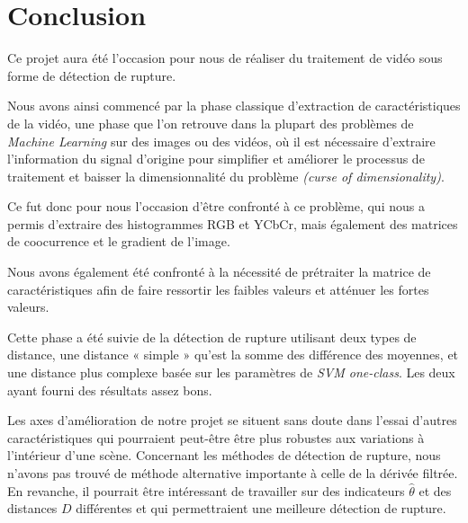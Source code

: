 \chapter{Conclusion}

Ce projet aura été l'occasion pour nous de réaliser du traitement de vidéo sous forme de détection de rupture.

Nous avons ainsi commencé par la phase classique d'extraction de caractéristiques de la vidéo, une phase que l'on retrouve dans la plupart des problèmes de \textit{Machine Learning} sur des images ou des vidéos, où il est nécessaire d'extraire l'information du signal d'origine pour simplifier et améliorer le processus de traitement et baisser la dimensionnalité du problème \textit{(curse of dimensionality)}.

Ce fut donc pour nous l'occasion d'être confronté à ce problème, qui nous a permis d'extraire des histogrammes RGB et YCbCr, mais également des matrices de coocurrence et le gradient de l'image.

Nous avons également été confronté à la nécessité de prétraiter la matrice de caractéristiques afin de faire ressortir les faibles valeurs et atténuer les fortes valeurs.

Cette phase a été suivie de la détection de rupture utilisant deux types de distance, une distance « simple » qu'est la somme des différence des moyennes, et une distance plus complexe basée sur les paramètres de \textit{SVM one-class}. Les deux ayant fourni des résultats assez bons.

Les axes d'amélioration de notre projet se situent sans doute dans l'essai d'autres caractéristiques qui pourraient peut-être être plus robustes aux variations à l'intérieur d'une scène. Concernant les méthodes de détection de rupture, nous n'avons pas trouvé de méthode alternative importante à celle de la dérivée filtrée. En revanche, il pourrait être intéressant de travailler sur des indicateurs $\hat{\theta}$ et des distances $D$ différentes et qui permettraient une meilleure détection de rupture.
